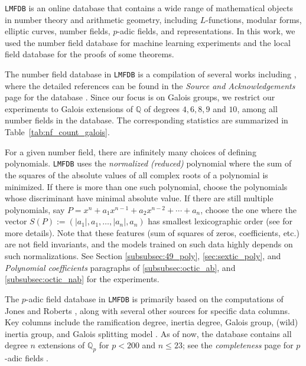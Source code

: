 \documentclass[letterpaper, 10pt]{article}
\newcommand{\1}{\mathds{1}}	%
\theoremstyle{definition}
\theoremstyle{remark}
\begin{document}
\texttt{LMFDB} \cite{lmfdb} is an online database that contains a wide range of mathematical objects in number theory and arithmetic geometry, including $L$-functions, modular forms, elliptic curves, number fields, $p$-adic fields, and representations.
In this work, we used the number field database for machine learning experiments and the local field database for the proofs of some theorems.

The number field database in \texttt{LMFDB} is a compilation of several works including \cite{kluners2001database,jones2014database,buchmann1993enumeration,oliver1992computation,voight2008enumeration,battistoni2020small}, where the detailed references can be found in the \emph{Source and Acknowledgements} page for the database \cite{lmfdb-nf-source}.
Since our focus is on Galois groups, we restrict our experiments to Galois extensions of $\mathbb Q$ of degrees $4,6,8,9$ and $10$, among all number fields in the database. The corresponding statistics are summarized in Table~\ref{tab:nf_count_galois}.

For a given number field, there are infinitely many choices of defining polynomials. 
\texttt{LMFDB} uses the \emph{normalized (reduced)} polynomial where the sum of the squares of the absolute values of all complex roots of a polynomial is minimized.
 If there is more than one such polynomial, choose the polynomials whose discriminant have minimal absolute value.
If there are still multiple polynomials, say $P = x^n + a_1 x^{n-1} + a_2 x^{n-2} + \cdots + a_n$, choose the one where the vector $S(P) := (|a_1|, a_1, \dots, |a_n|, a_n)$ has smallest lexicographic order (see \cite{lmfdb-nf-poly} for more details).
Note that these features (sum of squares of zeros, coefficients, etc.) are not field invariants, and the models trained on such data highly depends on such normalizations.
See Section \ref{subsubsec:49_poly}, \ref{sec:sextic_poly}, and \emph{Polynomial coefficients} paragraphs of \ref{subsubsec:octic_ab}, and \ref{subsubsec:octic_nab} for the experiments.


The \( p \)-adic field database in \texttt{LMFDB} is primarily based on the computations of Jones and Roberts \cite{jones2004nonic, roberts2006database, jones2008octic}, along with several other sources for specific data columns.  
Key columns include the ramification degree, inertia degree, Galois group, (wild) inertia group, and Galois splitting model \cite{carrillo2024finding}.
As of now, the database contains all degree \( n \) extensions of \( \mathbb{Q}_p \) for \( p < 200 \) and \( n \le 23 \); see the  \emph{completeness} page for $p$-adic fields \cite{lmfdb-completeness}.
\end{document}
